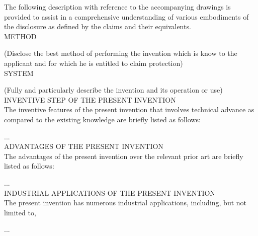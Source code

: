 The following description with reference to the accompanying drawings is provided to assist in a comprehensive understanding of various embodiments of the disclosure as defined by the claims and their equivalents. \\





\noindent
METHOD




	\noindent
	(Disclose the best method of performing the invention which is know to the applicant and for which he is entitled to claim protection)\\




\noindent
SYSTEM




	\noindent
	(Fully and particularly describe the invention and its operation or use)\\




\noindent
INVENTIVE STEP OF THE PRESENT INVENTION\\
The inventive features of the present invention that involves technical advance as compared to the existing knowledge are briefly listed as follows:




	...\\




\noindent
ADVANTAGES OF THE PRESENT INVENTION \\
The advantages of the present invention over the relevant prior art are briefly listed as follows:




	...\\




\noindent
INDUSTRIAL APPLICATIONS OF THE PRESENT INVENTION \\
The present invention has numerous industrial applications, including, but not limited to,




	...\\




